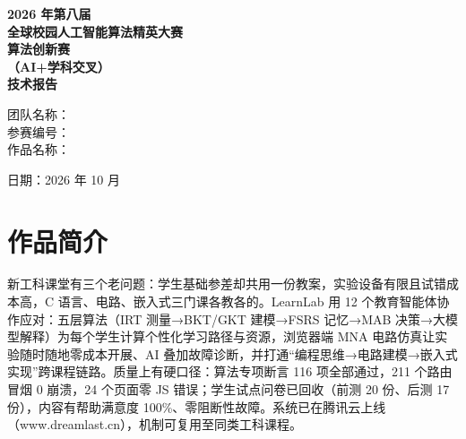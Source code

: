 \documentclass[zihao=-4,a4paper,UTF8,fontset=windows]{ctexart}
\begin{document}
\begin{titlepage}
\thispagestyle{cover}
\vspace*{2.8cm}
\begin{center}
{\bfseries{} 2026 年第八届}\\[0.8em]
{\bfseries{} 全球校园人工智能算法精英大赛}\\[3em]
{\bfseries{} 算法创新赛}\\[1em]
{\bfseries{}（AI+学科交叉）}\\[1em]
{\bfseries{} 技术报告}\\
\end{center}
\vspace{5em}
\begin{flushleft}
\hspace*{4em}
团队名称：\underline{}\\[0.8em]
\hspace*{4em}参赛编号：\underline{}\\[0.8em]
\hspace*{4em}作品名称：\underline{}\\
\end{flushleft}
\vfill
\begin{center} 日期：2026 年 10 月\end{center}
\vspace*{1.5cm}
\end{titlepage}
\setcounter{page}{1}
\begingroup
{}
\renewcommand{\contentsname}{目\quad 录}
\setcounter{tocdepth}{3}
\tableofcontents
\endgroup
\newpage
\section*{作品简介}


新工科课堂有三个老问题：学生基础参差却共用一份教案，实验设备有限且试错成本高，C 语言、电路、嵌入式三门课各教各的。LearnLab 用 12 个教育智能体协作应对：五层算法（IRT 测量→BKT/GKT 建模→FSRS 记忆→MAB 决策→大模型解释）为每个学生计算个性化学习路径与资源，浏览器端 MNA 电路仿真让实验随时随地零成本开展、AI 叠加故障诊断，并打通“编程思维→电路建模→嵌入式实现”跨课程链路。质量上有硬口径：算法专项断言 116 项全部通过，211 个路由冒烟 0 崩溃，24 个页面零 JS 错误；学生试点问卷已回收（前测 20 份、后测 17 份），内容有帮助满意度 100\%、零阻断性故障。系统已在腾讯云上线（www.dreamlast.cn），机制可复用至同类工科课程。
\end{document}
